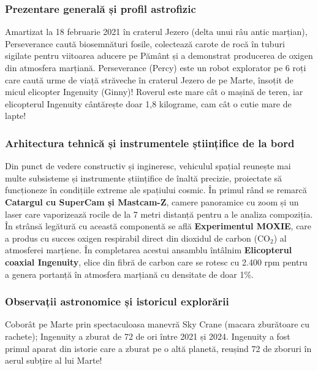 \subsubsection*{Prezentare generală și profil astrofizic}
Amartizat la 18 februarie 2021 în craterul Jezero (delta unui râu antic marțian), Perseverance caută biosemnături fosile, colectează carote de rocă în tuburi sigilate pentru viitoarea aducere pe Pământ și a demonstrat producerea de oxigen din atmosfera marțiană. Perseverance (\guillemotleft{}Percy\guillemotright{}) este un robot explorator pe 6 roți care caută urme de viață străveche în craterul Jezero de pe Marte, însoțit de micul elicopter Ingenuity (\guillemotleft{}Ginny\guillemotright{})! Roverul este mare cât o mașină de teren, iar elicopterul Ingenuity cântărește doar 1,8 kilograme, cam cât o cutie mare de lapte!

\subsubsection*{Arhitectura tehnică și instrumentele științifice de la bord}
Din punct de vedere constructiv și ingineresc, vehiculul spațial reunește mai multe subsisteme și instrumente științifice de înaltă precizie, proiectate să funcționeze în condițiile extreme ale spațiului cosmic. În primul rând se remarcă \textbf{Catargul cu SuperCam și Mastcam-Z}, camere panoramice cu zoom și un laser care vaporizează rocile de la 7 metri distanță pentru a le analiza compoziția. În strânsă legătură cu această componentă se află \textbf{Experimentul MOXIE}, care a produs cu succes oxigen respirabil direct din dioxidul de carbon (CO$_2$) al atmosferei marțiene. În completarea acestui ansamblu întâlnim \textbf{Elicopterul coaxial Ingenuity}, elice din fibră de carbon care se rotesc cu 2.400 rpm pentru a genera portanță în atmosfera marțiană cu densitate de doar 1\%.

\subsubsection*{Observații astronomice și istoricul explorării}
Coborât pe Marte prin spectaculoasa manevră \guillemotleft{}Sky Crane\guillemotright{} (macara zburătoare cu rachete); Ingenuity a zburat de 72 de ori între 2021 și 2024. Ingenuity a fost primul aparat din istorie care a zburat pe o altă planetă, reușind 72 de zboruri în aerul subțire al lui Marte!

